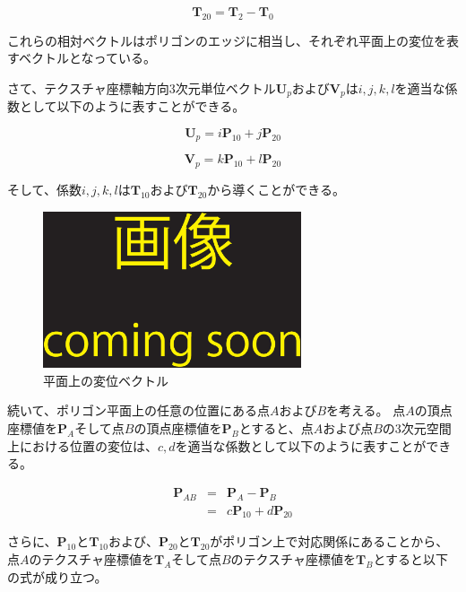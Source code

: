 \begin{equation}
\bm{T}_{20} = \bm{T}_2 - \bm{T}_0
\label{ET20}
\end{equation}

これらの相対ベクトルはポリゴンのエッジに相当し、それぞれ平面上の変位を表すベクトルとなっている。

さて、テクスチャ座標軸方向3次元単位ベクトル$\bm{U}_p$および$\bm{V}_p$は$i,j,k,l$を適当な係数として以下のように表すことができる。

\begin{equation}
\bm{U}_p = i\bm{P}_{10} + j\bm{P}_{20}
\label{EUp}
\end{equation}

\begin{equation}
\bm{V}_p = k\bm{P}_{10} + l\bm{P}_{20}
\label{EVp}
\end{equation}

そして、係数$i,j,k,l$は$\bm{T}_{10}$および$\bm{T}_{20}$から導くことができる。


\begin{figure}[h]
  \centering
  \includegraphics[width=3.0in]{./img/TEMP}
  \caption{平面上の変位ベクトル}
  \label{FAtoB}
\end{figure}

続いて、ポリゴン平面上の任意の位置にある点$A$および$B$を考える。
点$A$の頂点座標値を$\bm{P}_A$そして点$B$の頂点座標値を$\bm{P}_B$とすると、点$A$および点$B$の3次元空間上における位置の変位は、$c,d$を適当な係数として以下のように表すことができる。

\begin{eqnarray}
\bm{P}_{AB} &=& \bm{P}_A - \bm{P}_B\nonumber\\
           &=& c\bm{P}_{10} +  d\bm{P}_{20}  
\label{EPab}
\end{eqnarray}

さらに、$\bm{P}_{10}$と$\bm{T}_{10}$および、$\bm{P}_{20}$と$\bm{T}_{20}$がポリゴン上で対応関係にあることから、点$A$のテクスチャ座標値を$\bm{T}_A$そして点$B$のテクスチャ座標値を$\bm{T}_B$とすると以下の式が成り立つ。

